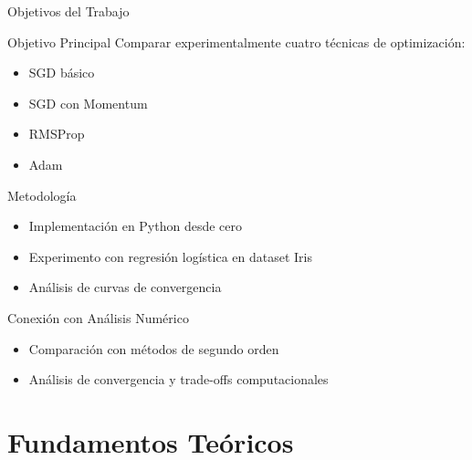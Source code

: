 \documentclass[10pt]{beamer}
\begin{document}
\begin{frame}{Objetivos del Trabajo}
\begin{block}{Objetivo Principal}
Comparar experimentalmente cuatro técnicas de optimización:
\begin{itemize}
\item SGD básico
\item SGD con Momentum  
\item RMSProp
\item Adam
\end{itemize}
\end{block}

\begin{block}{Metodología}
\begin{itemize}
\item Implementación en Python desde cero
\item Experimento con regresión logística en dataset Iris
\item Análisis de curvas de convergencia
\end{itemize}
\end{block}

\begin{block}{Conexión con Análisis Numérico}
\begin{itemize}
\item Comparación con métodos de segundo orden
\item Análisis de convergencia y trade-offs computacionales
\end{itemize}
\end{block}
\end{frame}

\section{Fundamentos Teóricos}
\end{document}
